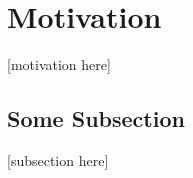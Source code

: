 \section{Motivation}
\label{section:motivation}
[motivation here]

\subsection{Some Subsection}
[subsection here]
